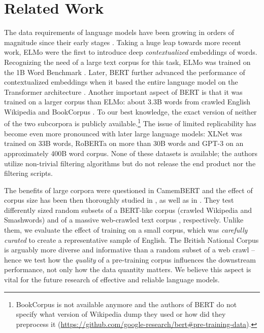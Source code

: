        
    
        

\section{Related Work}

The data requirements of language models have been growing in orders of magnitude since their early stages \citep{jelinek1976}. Taking a huge leap towards more recent work, 
ELMo \citep[Embeddings from Language Models; ][]{peters-etal-2018-deep} were the first to introduce deep \textit{contextualized} embeddings of words. Recognizing the need of a large text corpus for this task, ELMo was trained on the 1B Word Benchmark \citep{chelba14_interspeech}. Later, BERT \citep[Bidirectional Encoder Representations from Transformers; ][]{devlin-etal-2019-bert} further advanced the performance of contextualized embeddings when it based the entire language model on the Transformer architecture \citep{NIPS2017_3f5ee243}. Another important aspect of BERT is that it was trained on a larger corpus than ELMo: about 3.3B words from crawled English Wikipedia and BookCorpus \citep{7410368}. To our best knowledge, the exact version of neither of the two subcorpora is publicly available.\footnote{BookCorpus \citep{7410368} is not available anymore and the authors of BERT do not specify what version of Wikipedia dump they used or how did they preprocess it (\url{https://github.com/google-research/bert\#pre-training-data}).} The issue of limited replicability has become even more pronounced with later large language models: XLNet \cite{NEURIPS2019_dc6a7e65} was trained on 33B words, RoBERTa \citep{DBLP:journals/corr/abs-1907-11692} on more than 30B words and GPT-3 \citep{NEURIPS2020_1457c0d6} on an approximately 400B word corpus. None of these datasets is available; the authors utilize non-trivial filtering algorithms but do not release the end product nor the filtering scripts.

The benefits of large corpora were questioned in CamemBERT \citep{martin-etal-2020-camembert} and the effect of corpus size has been then thoroughly studied in ,  as well as in . They test differently sized random subsets of a BERT-like corpus (crawled Wikipedia and Smashwords) and of a massive web-crawled text corpus \citep[MassiveText;][]{https://doi.org/10.48550/arxiv.2112.11446}, respectively. Unlike them, we evaluate the effect of training on a small corpus, which was \textit{carefully curated} to create a representative sample of English. The British National Corpus is arguably more diverse and informative than a random subset of a web crawl -- hence we test how the \textit{quality} of a pre-training corpus influences the downstream performance, not only how the data quantity matters. We believe this aspect is vital for the future research of effective and reliable language models.

